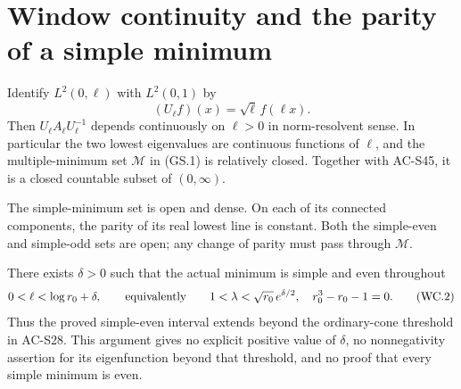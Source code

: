 \section{Window continuity and the parity of a simple minimum}
\label{sec:spectral-window-continuity}

\begin{theorem}
\label{AC-S46}
Identify \(L^2(0,\ell)\) with \(L^2(0,1)\) by
\[
                   (U_\ell f)(x)=\sqrt\ell\,f(\ell x).
                                                               \tag{WC.1}
\]
Then \(U_\ell A_\ell U_\ell^{-1}\) depends continuously
on \(\ell>0\) in norm-resolvent sense.  In particular the
two lowest eigenvalues are continuous functions of \(\ell\),
and the multiple-minimum set \(\mathcal M\) in (GS.1)
is relatively closed.  Together with AC-S45, it is a closed
countable subset of \((0,\infty)\).

The simple-minimum set is open and dense.  On each of its
connected components, the parity of its real lowest line is
constant.  Both the simple-even and simple-odd sets are open;
any change of parity must pass through \(\mathcal M\).

There exists \(\delta>0\) such that the actual minimum is
simple and even throughout
\[
       0<\ell<\log r_0+\delta,
       \qquad\hbox{equivalently}\qquad
       1<\lambda<\sqrt{r_0}\,e^{\delta/2},
       \quad r_0^3-r_0-1=0.                              \tag{WC.2}
\]
Thus the proved simple-even interval extends beyond the
ordinary-cone threshold in AC-S28.  This argument gives no
explicit positive value of \(\delta\), no nonnegativity
assertion for its eigenfunction beyond that threshold, and
no proof that every simple minimum is even.
\end{theorem}

